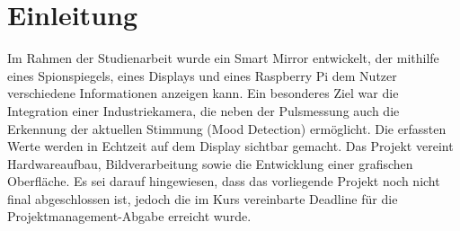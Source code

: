 
\chapter{Einleitung}

Im Rahmen der Studienarbeit wurde ein Smart Mirror entwickelt, der mithilfe eines Spionspiegels, eines Displays und eines Raspberry Pi dem Nutzer verschiedene Informationen anzeigen kann. Ein besonderes Ziel war die Integration einer Industriekamera, die neben der Pulsmessung auch die Erkennung der aktuellen Stimmung (Mood Detection) ermöglicht. Die erfassten Werte werden in Echtzeit auf dem Display sichtbar gemacht. Das Projekt vereint Hardwareaufbau, Bildverarbeitung sowie die Entwicklung einer grafischen Oberfläche.
Es sei darauf hingewiesen, dass das vorliegende Projekt noch nicht final abgeschlossen ist, jedoch die im Kurs vereinbarte Deadline für die Projektmanagement-Abgabe erreicht wurde. 
